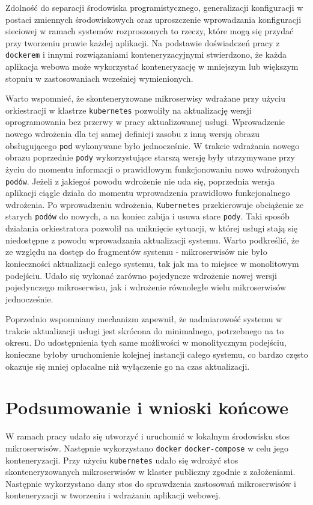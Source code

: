 \documentclass[12pt,twoside]{article}
\begin{document}
Zdolność do separacji środowiska programistycznego, generalizacji konfiguracji w postaci zmiennych środowiskowych oraz uproszczenie wprowadzania konfiguracji sieciowej w ramach systemów rozproszonych to rzeczy, które mogą się przydać przy tworzeniu prawie każdej aplikacji. Na podstawie doświadczeń pracy z \texttt{dockerem} i innymi rozwiązaniami konteneryzacyjnymi stwierdzono, że każda aplikacja webowa może wykorzystać konteneryzację w mniejszym lub większym stopniu w zastosowaniach wcześniej wymienionych.

Warto wspomnieć, że skonteneryzowane mikroserwisy wdrażane przy użyciu orkiestracji w klastrze \texttt{kubernetes} pozwoliły na aktualizację wersji oprogramowania bez przerwy w pracy aktualizowanej usługi. Wprowadzenie nowego wdrożenia dla tej samej definicji zasobu z inną wersją obrazu obsługującego \texttt{pod} wykonywane było jednocześnie. W trakcie wdrażania nowego obrazu poprzednie \texttt{pody} wykorzystujące starszą wersję były utrzymywane przy życiu do momentu informacji o prawidłowym funkcjonowaniu nowo wdrożonych \texttt{podów}. Jeżeli z jakiegoś powodu wdrożenie nie uda się, poprzednia wersja aplikacji ciągle działa do momentu wprowadzenia prawidłowo funkcjonalnego wdrożenia. Po wprowadzeniu wdrożenia, \texttt{Kubernetes} przekierowuje obciążenie ze starych \texttt{podów} do nowych, a na koniec zabija i usuwa stare \texttt{pody}. Taki sposób działania orkiestratora pozwolił na uniknięcie sytuacji, w której usługi stają się niedostępne z powodu wprowadzania aktualizacji systemu. Warto podkreślić, że ze względu na dostęp do fragmentów systemu - mikroserwisów nie było konieczności aktualizacji całego systemu, tak jak ma to miejsce w monolitowym podejściu. Udało się wykonać zarówno pojedyncze wdrożenie nowej wersji pojedynczego mikroserwisu, jak i wdrożenie równoległe wielu mikroserwisów jednocześnie. 

Poprzednio wspomniany mechanizm zapewnił, że nadmiarowość systemu w trakcie aktualizacji usługi jest skrócona do minimalnego, potrzebnego na to okresu. Do udostępnienia tych same możliwości w monolitycznym podejściu, konieczne byłoby uruchomienie kolejnej instancji całego systemu, co bardzo często okazuje się mniej opłacalne niż wyłączenie go na czas aktualizacji.
\clearpage

\section{Podsumowanie i wnioski końcowe}

W ramach pracy udało się utworzyć i uruchomić w lokalnym środowisku stos mikroserwisów. Następnie wykorzystano \texttt{docker} \texttt{docker-compose} w celu jego konteneryzacji. Przy użyciu \texttt{kubernetes}  udało się wdrożyć stos skonteneryzowanych mikroserwisów w klaster publiczny zgodnie z założeniami. Następnie wykorzystano dany stos do sprawdzenia zastosowań mikroserwisów i konteneryzacji w tworzeniu i wdrażaniu aplikacji webowej.
\end{document}
